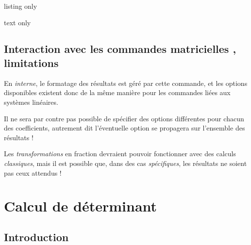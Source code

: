\documentclass[a4paper,11pt]{article}
\begin{document}
\begin{PresentationCode}{listing only}




\end{PresentationCode}

\begin{PresentationCode}{text only}
\hfill{} \qquad
{} \qquad
{} \qquad
{} \qquad
{}\hfill~
\end{PresentationCode}

\subsection{Interaction avec les commandes \og matricielles \fg, limitations}

\begin{warningblock}
En \textit{interne}, le formatage des résultats est géré par cette commande, et les options disponibles existent donc de la même manière pour les commandes liées aux systèmes linéaires.

\smallskip

Il ne sera par contre pas possible de spécifier des options différentes pour chacun des coefficients, autrement dit l'éventuelle option se propagera sur l'ensemble des résultats !

\smallskip

Les \textit{transformations} en fraction devraient pouvoir fonctionner avec des calculs \textit{classiques}, mais il est possible que, dans des cas \textit{spécifiques}, les résultats ne soient pas ceux attendus !
\end{warningblock}

\pagebreak

\section{Calcul de déterminant}

\subsection{Introduction}
\end{document}
